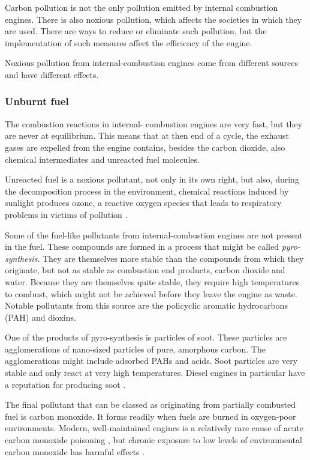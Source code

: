 Carbon pollution is not the only pollution emitted by internal combustion
engines. There is also noxious pollution, which affects the societies in which
they are used. There are ways to reduce or eliminate such pollution, but the
implementation of such measures affect the efficiency of the engine. 

Noxious pollution from internal\hyp{}combustion engines come from different sourc\-es
and have different effects.

\subsubsection{Unburnt fuel}

The combustion reactions in internal\hyp{} combustion engines are very fast, but
they are never at equilibrium. This means that at then end of a cycle, the
exhaust gases are expelled from the engine contains, besides the carbon dioxide,
also chemical intermediates and unreacted fuel molecules.

Unreacted fuel is a noxious pollutant, not only in its own right, but also,
during the decomposition process in the environment, chemical reactions induced
by sunlight produces ozone, a reactive oxygen species that leads to respiratory
problems in victims of pollution \autocite{Davidson1998}.

Some of the fuel-like pollutants from internal\hyp{}combustion engines are not
present in the fuel. These compounds are formed in a process that might be
called \textit{pyro-synthesis}. They are themselves more stable than the
compounds from which they originate, but not as stable as combustion end
products, carbon dioxide and water. Because they are themselves quite stable,
they require high temperatures to combust, which might not be achieved before
they leave the engine as waste. Notable pollutants from this source are the
policyclic aromatic hydrocarbons (PAH) and dioxins.

One of the products of pyro-synthesis is particles of soot. These particles are
agglomerations of nano-sized particles of pure, amorphous carbon. The
agglomerations might include adsorbed PAHs and acids. Soot particles are very
stable and only react at very high temperatures. Diesel engines in particular
have a reputation for producing soot \autocite{Mohankumar2017}.

The final pollutant that can be classed as originating from partially combusted
fuel is carbon monoxide. It forms readily when fuels are burned in oxygen-poor
environments. Modern, well-maintained engines is a relatively rare cause of
acute carbon monoxide poisoning \autocite{Reumuth2018}, but chronic exposure to
low levels of environmental carbon monoxide has harmful effects
\autocite{Wright2002}.

